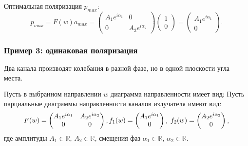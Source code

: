 Оптимальная поляризация $p_{max}$:
\[
    p_{max}
    = F(w) a_{max}
    = \begin{pmatrix}
          A_1 e^{i \alpha_1} & 0                  \\
          0                  & A_2 e^{i \alpha_2}
    \end{pmatrix}
    \begin{pmatrix}
        1 \\
        0
    \end{pmatrix}
    = \begin{pmatrix}
          A_1 e^{i \alpha_1} \\
          0
    \end{pmatrix} .
\]

\subsubsection{Пример 3: одинаковая поляризация}

Два канала производят колебания в разной фазе, но в одной плоскости угла места.

Пусть в выбранном направлении $w$ диаграмма направленности имеет вид:
Пусть парциальные диаграммы направленности каналов излучателя имеют вид:
\[
    F(w)
    =
    \begin{pmatrix}
        A_1 e^{i \alpha_1} & A_2 e^{i \alpha_2} \\
        0                  & 0
    \end{pmatrix} , \\
%
    f_1(w) = \begin{pmatrix}
                 A_1 e^{i \alpha_1} \\
                 0
    \end{pmatrix}
    , \;
    f_2(w) = \begin{pmatrix}
                 A_2 e^{i \alpha_2} \\
                 0
    \end{pmatrix} ,
\]
где амплитуды $A_1 \in \mathbb{R}$, $A_2 \in \mathbb{R}$, смещения фаз $\alpha_1 \in \mathbb{R}$, $\alpha_2 \in \mathbb{R}$.

